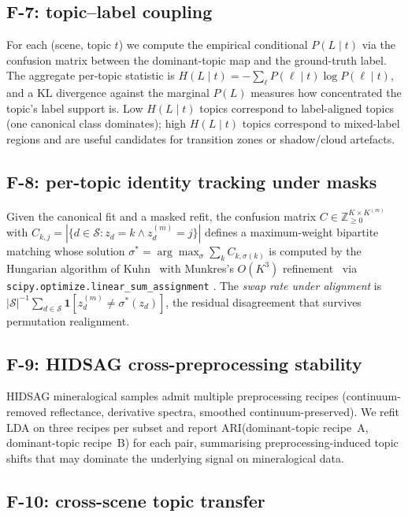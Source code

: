 \documentclass[journal,a4paper,10pt]{IEEEtran}
\begin{document}
\subsection{F-7: topic--label coupling}

For each (scene, topic $t$) we compute the empirical conditional
$P(L \mid t)$ via the confusion matrix between the dominant-topic
map and the ground-truth label. The aggregate per-topic statistic is
$H(L \mid t) = -\sum_\ell P(\ell \mid t) \log P(\ell \mid t)$, and a
KL divergence against the marginal $P(L)$ measures how concentrated
the topic's label support is. Low $H(L \mid t)$ topics correspond to
label-aligned topics (one canonical class dominates); high
$H(L \mid t)$ topics correspond to mixed-label regions and are useful
candidates for transition zones or shadow/cloud artefacts.

\subsection{F-8: per-topic identity tracking under masks}
\label{sec:f8}

Given the canonical fit and a masked refit, the confusion matrix
$C \in \mathbb{Z}_{\ge 0}^{K \times K^{(m)}}$ with
$C_{k,j} = |\{d \in \mathcal{S} : z_d = k \wedge z^{(m)}_d = j\}|$
defines a maximum-weight bipartite matching whose solution
$\sigma^* = \arg\max_\sigma \sum_k C_{k, \sigma(k)}$ is computed by
the Hungarian algorithm of Kuhn~\cite{kuhn1955hungarian} with
Munkres's $O(K^3)$ refinement~\cite{munkres1957algorithms} via
\texttt{scipy.optimize.linear\_sum\_assignment}
\cite{scipy_assignment}. The \emph{swap rate under alignment} is
$|\mathcal{S}|^{-1} \sum_{d \in \mathcal{S}} \mathbf{1}[z^{(m)}_d
\neq \sigma^*(z_d)]$, the residual disagreement that survives
permutation realignment.

\subsection{F-9: HIDSAG cross-preprocessing stability}

HIDSAG mineralogical samples admit multiple preprocessing recipes
(continuum-removed reflectance, derivative spectra, smoothed
continuum-preserved). We refit LDA on three recipes per subset and
report ARI(dominant-topic recipe~A, dominant-topic recipe~B) for each
pair, summarising preprocessing-induced topic shifts that may dominate
the underlying signal on mineralogical data.

\subsection{F-10: cross-scene topic transfer}
\end{document}
